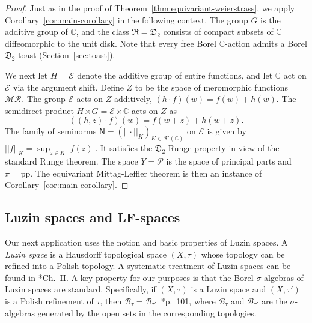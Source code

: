 \documentclass[12pt]{paper}
\numberwithin{equation}{section}
\theoremstyle{plain}
\theoremstyle{definition}
\newcommand{\C}{\mathbb{C}}
\newcommand{\mfD}{\mathfrak{D}}
\newcommand{\mfR}{\mathfrak{R}}
\newcommand{\borel}{\mathcal{B}}
\newcommand{\vietoris}[2][]{\mathcal{K}_{#1}(#2)}
\newcommand{\merom}[1][]{\mathcal{MR}_{#1}}
\newcommand{\holom}[1][]{\mathcal{E}_{#1}}
\newcommand{\ppart}{\mathcal{P}}
\newcommand{\ppm}{\mathrm{pp}}      %
\newcommand{\unifn}{\mathsf{N}}
\newcommand{\norm}[1]{||#1||}
\begin{document}
\begin{proof}
  Just as in the proof of Theorem~\ref{thm:equivariant-weierstrass}, we apply
  Corollary~\ref{cor:main-corollary} in the following context.  The group \(G\) is the additive
  group of \(\C\), and the class \(\mfR = \mfD_{2}\) consists of compact subsets of \(\C\)
  diffeomorphic to the unit disk. Note that every free Borel \(\C\)-action admits a Borel
  \(\mfD_{2}\)-toast (Section~\ref{sec:toast}).

  We next let \(H = \holom\) denote the additive group of entire functions, and let \(\C \) act on
  \(\holom\) via the argument shift.  Define \(Z\) to be the space of meromorphic
  functions~\(\merom\). The group \(\holom\) acts on \(Z\) additively,
  \( (h \cdot f)(w) = f(w) + h(w)\).  The semidirect product \(H \rtimes G = \holom \rtimes \C\)
  acts on \(Z\) as
  \[((h,z) \cdot f)(w) = f(w+z) + h(w+z).\]
  The family of seminorms \(\unifn = (\norm{\cdot}_{K})_{K \in \vietoris{\C}}\) on \(\holom\) is
  given by \(\norm{f}_{K} = \sup_{z \in K} |f(z)|\).  It satisfies the \(\mfD_{2}\)-Runge property
  in view of the standard Runge theorem.  The space \(Y = \ppart\) is the space of principal parts
  and \(\pi = \ppm\).  The equivariant Mittag-Leffler theorem is then an instance of
  Corollary~\ref{cor:main-corollary}.
\end{proof}






\subsection{Luzin spaces and LF-spaces}
\label{sec:lusin-space}

Our next application uses the notion and basic properties of Luzin spaces.  A \emph{Luzin space} is
a Hausdorff topological space \((X,\tau)\) whose topology can be refined into a Polish topology.  A
systematic treatment of Luzin spaces can be found in
\cite{schwartzRadonMeasuresArbitrary1973}*{Ch.~II}.  A key property for our purposes is that the
Borel \(\sigma\)-algebras of Luzin spaces are standard.  Specifically, if \((X,\tau)\) is a Luzin
space and \((X,\tau')\) is a Polish refinement of \(\tau\), then
\(\borel_{\tau} = \borel_{\tau'}\)~\cite{schwartzRadonMeasuresArbitrary1973}*{p.~101}, where
\(\borel_{\tau}\) and \(\borel_{\tau'}\) are the \(\sigma\)-algebras generated by the open sets in
the corresponding topologies.
\end{document}
